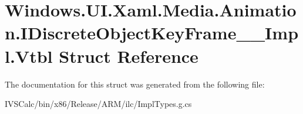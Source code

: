 \hypertarget{struct_windows_1_1_u_i_1_1_xaml_1_1_media_1_1_animation_1_1_i_discrete_object_key_frame_____impl_1_1_vtbl}{}\section{Windows.\+U\+I.\+Xaml.\+Media.\+Animation.\+I\+Discrete\+Object\+Key\+Frame\+\_\+\+\_\+\+Impl.\+Vtbl Struct Reference}
\label{struct_windows_1_1_u_i_1_1_xaml_1_1_media_1_1_animation_1_1_i_discrete_object_key_frame_____impl_1_1_vtbl}


The documentation for this struct was generated from the following file\+:\begin{DoxyCompactItemize}
\item 
I\+V\+S\+Calc/bin/x86/\+Release/\+A\+R\+M/ilc/Impl\+Types.\+g.\+cs\end{DoxyCompactItemize}
